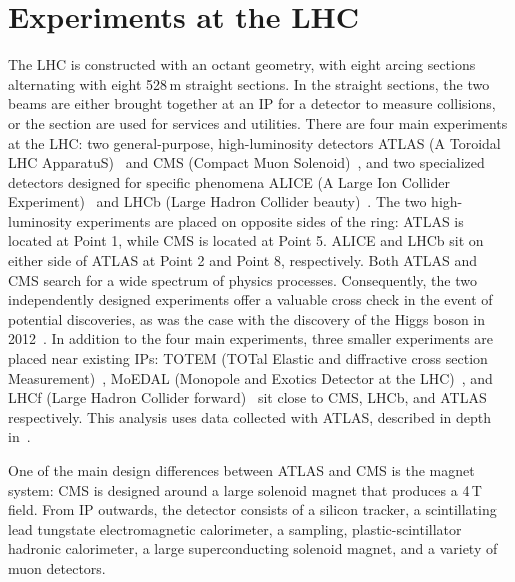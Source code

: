 \section{Experiments at the LHC}
\label{ch:lhc:exp}
The LHC is constructed with an octant geometry,
with eight arcing sections alternating with eight 528\,m straight sections. In the straight sections, the two beams are either brought together at an IP for a detector to measure collisions, or the section are used for services and utilities. There are four main experiments at the LHC: two general-purpose, high-luminosity detectors ATLAS (A Toroidal LHC ApparatuS)~\cite{ATLAS} and CMS (Compact Muon Solenoid)~\cite{CMS}, and two specialized detectors designed for specific phenomena ALICE (A Large Ion Collider Experiment)~\cite{ALICE} and LHCb (Large Hadron Collider beauty)~\cite{LHCb}. The two high-luminosity experiments are placed on opposite sides of the ring: ATLAS is located at Point 1, while CMS is located at Point 5. ALICE and LHCb sit on either side of ATLAS at Point 2 and Point 8, respectively. Both ATLAS and CMS search for a wide spectrum of physics processes. Consequently, the two independently designed experiments offer a valuable cross check in the event of potential discoveries, as was the case with the discovery of the Higgs boson in 2012~\cite{Higgs_atlas,Higgs_cms}. In addition to the four main experiments, three smaller experiments are placed near existing IPs: TOTEM (TOTal Elastic and diffractive cross section Measurement)~\cite{TOTEM}, MoEDAL (Monopole and Exotics Detector at the LHC)~\cite{MoEDAL}, and LHCf (Large Hadron Collider forward)~\cite{LHCf} sit close to CMS, LHCb, and ATLAS respectively. This analysis uses data collected with ATLAS, described in depth in~\Ch{\ref{ch:atlas}}.

\iffalse
One of the main design differences between ATLAS and CMS is the magnet system: CMS is designed around a large solenoid magnet that produces a 4\,T field. From IP outwards, the detector consists of a silicon tracker, a scintillating lead tungstate electromagnetic calorimeter, a sampling, plastic-scintillator hadronic calorimeter, a large superconducting solenoid magnet, and a variety  of muon detectors.

